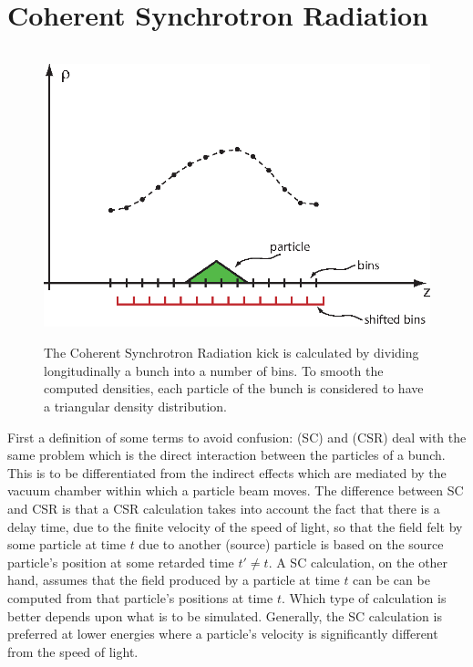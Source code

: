 \section{Coherent Synchrotron Radiation}
\label{s:csr}   

\begin{figure}[!b]
\centering
\includegraphics[height=8.4cm]{csr-bin.eps}
\caption[CSR Calculation]
{The Coherent Synchrotron Radiation kick is calculated by dividing
longitudinally a bunch into a number of bins. To smooth the computed
densities, each particle of the bunch is considered to have a
triangular density distribution.}
\label{f:csr.bin}
\end{figure}

First a definition of some terms to avoid confusion:  (SC)
and  (CSR) deal with the same problem
which is the direct interaction between the particles of a bunch. This is
to be differentiated from the indirect  effects which are
mediated by the vacuum chamber within which a particle beam moves. The
difference between SC and CSR is that a CSR calculation takes into account
the fact that there is a delay time, due to the finite velocity of the
speed of light, so that the field felt by some particle at time $t$ due to
another (source) particle is based on the source particle's position at
some retarded time $t' \ne t$. A SC calculation, on the other hand, assumes
that the field produced by a particle at time $t$ can be can be computed
from that particle's positions at time $t$. Which type of calculation is
better depends upon what is to be simulated. Generally, the SC calculation
is preferred at lower energies where a particle's velocity is significantly
different from the speed of light.

